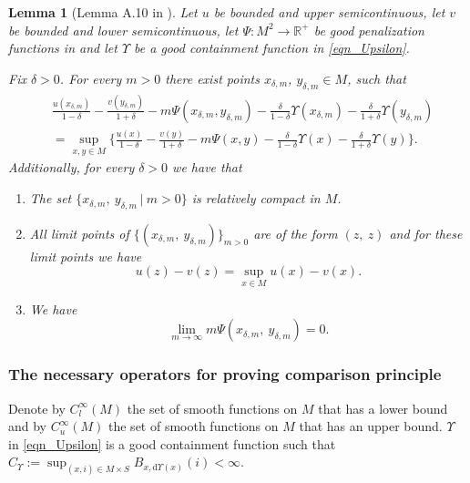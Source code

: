 \documentclass[a4paper]{article}
\newcommand{\dd}{ \mathrm{d}}
\numberwithin{equation}{section}
\newtheorem{lemma}[theorem]{Lemma}
\theoremstyle{definition}
\begin{document}
\begin{lemma}[Lemma A.10 in \cite{CK_2017}]\label{lem_pro3.7}
Let $u$ be bounded and upper semicontinuous, let $v$ be bounded and lower semicontinuous, let $\Psi:M^2\to \mathbb{R}^+$ be good penalization functions in  and let $\Upsilon$ be a good containment function in \eqref{eqn_Upsilon}. 
\par
Fix $\delta>0$. For every $m>0$ there exist points $x_{\delta,m}$, $y_{\delta,m}\in M$, such that
\begin{equation}\label{eqn:Text_function}
\begin{split}
&\frac{u(x_{\delta,m})}{1-\delta}-\frac{v(y_{\delta,m})}{1+\delta}-m\Psi(x_{\delta,m},y_{\delta,m})-\frac{\delta}{1-\delta}\Upsilon(x_{\delta,m})-\frac{\delta}{1+\delta}\Upsilon(y_{\delta,m})\\
&=\sup_{x,y\in M}\big\{\frac{u(x)}{1-\delta}-\frac{v(y)}{1+\delta}-m\Psi(x,y)-\frac{\delta}{1-\delta}\Upsilon(x)-\frac{\delta}{1+\delta}\Upsilon(y)\big\}.
\end{split}
\end{equation}
Additionally, for every $\delta>0$ we have that
\begin{enumerate}
\item \label{item_iaa} The set $\{x_{\delta,m},~y_{\delta,m} ~|~m >0\}$ is relatively compact in $M$.
\item \label{item_ibb} All limit points of $\{(x_{\delta,m},~y_{\delta,m})\}_{m >0}$ are of the form $(z,~z)$ and for these limit points we have 
\begin{equation*}
 u(z)-v(z)=\sup_{x\in M}u(x)-v(x).   
\end{equation*}
\item \label{item_icc} We have
\begin{equation*}
\lim_{m\to\infty}m\Psi(x_{\delta,m},~y_{\delta,m})=0.
\end{equation*}
\end{enumerate}
\end{lemma}

\subsubsection{The necessary operators for proving comparison principle}
Denote by $C_l^{\infty}(M)$ the set of smooth functions on $M$ that has a lower bound and by $C_u^\infty(M)$ the set of smooth functions on $M$ that has an upper bound. $\Upsilon$ in \eqref{eqn_Upsilon} is a good containment function such that $C_\Upsilon:=\sup_{(x,i)\in M\times S}B_{x,\dd \Upsilon(x)}(i)<\infty$.
\end{document}
